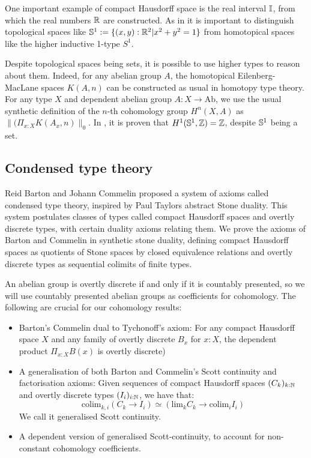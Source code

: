 \documentclass{../util/zariski}
\begin{document}
One important example of compact Hausdorff space is the real interval $\mathbb{I}$, from which the real numbers $\mathbb{R}$ are constructed.
As in \cite{shulman-Brouwer-fixed-point} it is important to distinguish topological spaces like $\mathbb{S}^1:=\{(x,y):\mathbb{R}^2\vert x^2+y^2=1\}$ from homotopical spaces like the higher inductive 1-type $S^1$.

Despite topological spaces being sets, it is possible to use higher types to reason about them. Indeed, for any abelian group $A$, the homotopical Eilenberg-MacLane spaces $K(A,n)$ can be constructed as usual in homotopy type theory. For any type $X$ and dependent abelian group $A:X\to \mathrm{Ab}$, we use the usual synthetic definition of the $n$-th cohomology group $H^n(X,A)$ as $\|(\Pi_{x:X}K(A_x,n)\|_0$. In \cite{synthetic-stone-duality}, it is proven that $H^1(\mathbb{S}^1,\mathbb{Z})=\mathbb{Z}$, despite $\mathbb{S}^1$ being a set.

\subsection*{Condensed type theory}

Reid Barton and Johann Commelin proposed a system of axioms called condensed type theory, inspired by Paul Taylors abstract Stone duality. This system postulates classes of types called compact Hausdorff spaces and overtly discrete types, with certain duality axioms relating them. We prove the axioms of Barton and Commelin in synthetic stone duality, defining compact Hausdorff spaces as quotients of Stone spaces by closed equivalence relations and overtly discrete types as sequential colimits of finite types.

An abelian group is overtly discrete if and only if it is countably presented, so we will use countably presented abelian groups as coefficients for cohomology. The following are crucial for our cohomology results:
\begin{itemize} 
\item Barton's Commelin dual to Tychonoff's axiom: For any compact Hausdorff space $X$ and any family of overtly discrete $B_x$ for $x:X$, the dependent product $\Pi_{x:X}B(x)$ is overtly discrete) 
\item A generalisation of both Barton and Commelin's Scott continuity and factorisation axioms: Given sequences of compact Hausdorff spaces $(C_k)_{k:\mathbb{N}}$ and overtly discrete types $(I_i)_{i:\mathbb{N}}$, we have that:
\[\mathrm{colim}_{k,i}(C_k\to I_i) \simeq \left(\mathrm{lim}_kC_k \to \mathrm{colim}_iI_i\right)\]
We call it generalised Scott continuity.
\item A dependent version of generalised Scott-continuity, to account for non-constant cohomology coefficients.
\end{itemize}
\end{document}
